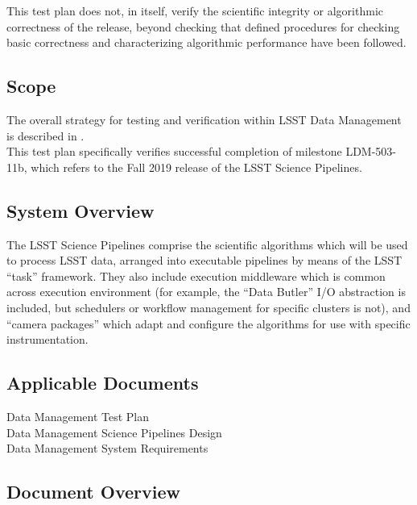 \documentclass[DM,lsstdraft,STR,toc]{lsstdoc}
\begin{document}
This test plan does not, in itself, verify the scientific integrity or
algorithmic correctness of the release, beyond checking that defined
procedures for checking basic correctness and characterizing algorithmic
performance have been followed.\\[2\baselineskip]

\subsection{Scope}\label{scope}

The overall strategy for testing and verification within LSST Data
Management is described in .\\
This test plan specifically verifies successful completion of milestone
LDM-503-11b, which refers to the Fall 2019 release of the LSST Science
Pipelines.



\subsection{System Overview}
\label{sect:systemoverview}

The LSST Science Pipelines comprise the scientific algorithms which will
be used to process LSST data, arranged into executable pipelines by
means of the LSST ``task'' framework. They also include execution
middleware which is common across execution environment (for example,
the ``Data Butler'' I/O abstraction is included, but schedulers or
workflow management for specific clusters is not), and ``camera
packages'' which adapt and configure the algorithms for use with
specific instrumentation.\\[2\baselineskip]

\subsection{\texorpdfstring{Applicable Documents\\
}{Applicable Documents }}\label{applicable-documents}

 Data Management Test Plan\\
 Data Management Science Pipelines Design\\
 Data Management System Requirements


\subsection{Document Overview}
\label{sect:docoverview}
\end{document}
